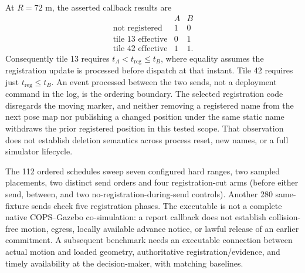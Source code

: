 \documentclass[11pt]{article}
\begin{document}
At \(R=72\) m, the asserted callback results are
\[
\begin{array}{lcc}
 & A & B\\
\text{not registered} & 1 & 0\\
\text{tile 13 effective} & 0 & 1\\
\text{tile 42 effective} & 1 & 1.
\end{array}
\]
Consequently tile 13 requires \(t_A<t_\mathrm{reg}\le t_B\), where equality
assumes the registration update is processed before dispatch at that
instant. Tile 42 requires just \(t_\mathrm{reg}\le t_B\). An event processed
between the two sends, not a deployment command in the log, is the
ordering boundary. The selected registration code disregards the moving
marker, and neither removing a registered name from the next pose map
nor publishing a changed position under the same static name withdraws
the prior registered position in this tested scope. That observation
does not establish deletion semantics across process reset,
new names, or a full simulator lifecycle.

The 112 ordered schedules sweep seven configured hard ranges, two sampled
placements, two distinct send orders and four registration-cut arms
(before either send, between, and two no-registration-during-send controls).
Another 280 same-fixture sends check five registration phases.
The executable is not a complete native COPS--Gazebo co-simulation:
a report callback does not establish collision-free motion, egress, locally
available advance notice, or lawful release of an earlier commitment.
A subsequent benchmark needs an executable connection between actual
motion and loaded geometry, authoritative registration/evidence, and
timely availability at the decision-maker, with matching baselines.
\end{document}
